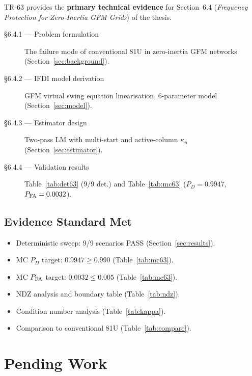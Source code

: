 \documentclass[11pt, a4paper]{article}
\newcommand{\kn}{\kappa_n}
\begin{document}
TR-63 provides the \textbf{primary technical evidence} for Section~6.4
(\emph{Frequency Protection for Zero-Inertia GFM Grids}) of the thesis.

\begin{description}
  \item[§6.4.1 — Problem formulation]  The failure mode of conventional 81U
    in zero-inertia GFM networks (Section~\ref{sec:background}).
  \item[§6.4.2 — IFDI model derivation]  GFM virtual swing equation
    linearisation, 6-parameter model (Section~\ref{sec:model}).
  \item[§6.4.3 — Estimator design]  Two-pass LM with multi-start and
    active-column $\kn$ (Section~\ref{sec:estimator}).
  \item[§6.4.4 — Validation results]  Table~\ref{tab:det63} (9/9 det.)
    and Table~\ref{tab:mc63} ($P_D = 0.9947$, $P_{\rm FA} = 0.0032$).
\end{description}

\subsection{Evidence Standard Met}

\begin{itemize}
  \item[$\checkmark$] Deterministic sweep: 9/9 scenarios PASS (Section~\ref{sec:results}).
  \item[$\checkmark$] MC $P_D$ target: $0.9947 \geq 0.990$ (Table~\ref{tab:mc63}).
  \item[$\checkmark$] MC $P_{\rm FA}$ target: $0.0032 \leq 0.005$ (Table~\ref{tab:mc63}).
  \item[$\checkmark$] NDZ analysis and boundary table (Table~\ref{tab:ndz}).
  \item[$\checkmark$] Condition number analysis (Table~\ref{tab:kappa}).
  \item[$\checkmark$] Comparison to conventional 81U (Table~\ref{tab:compare}).
\end{itemize}


\section{Pending Work}
\label{sec:pending}
\end{document}
